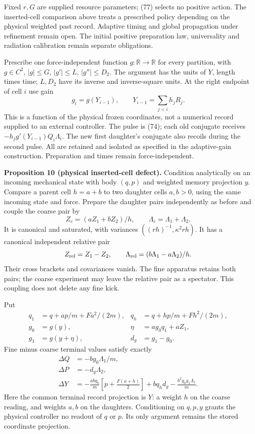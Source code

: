 \documentclass[11pt,a4paper]{article}
\begin{document}
Fixed \(r,G\) are supplied resource parameters; (77) selects no positive
action. The inserted-cell comparison above treats a prescribed policy
depending on the physical weighted past record. Adaptive timing and
global propagation under refinement remain open. The initial positive
preparation law, universality and radiation calibration remain separate
obligations.

Prescribe one force-independent function \(g:\mathbb R\to\mathbb R\) for
every partition, with \(g\in C^2\), \(|g|\le G\), \(|g'|\le L\),
\(|g''|\le D_2\). The argument has the units of \(Y\), length times
time; \(L,D_2\) have its inverse and inverse-square units. At the right
endpoint of cell \(i\) use gain
\[g_i=g(Y_{i-1}),\qquad Y_{i-1}=\sum_{j<i}h_jR_j.\] This is a function
of the physical frozen coordinates, not a numerical record supplied to
an external controller. The pulse is (74); each old conjugate receives
\(-h_jg'(Y_{i-1})Q_i\Lambda_i\). The new first daughter's conjugate also
recoils during the second pulse. All are retained and isolated as
specified in the adaptive-gain construction. Preparation and times
remain force-independent.

\textbf{Proposition 10 (physical inserted-cell defect).} Condition
analytically on an incoming mechanical state with body \((q,p)\) and
weighted memory projection \(y\). Compare a parent cell \(h=a+b\) to two
daughter cells \(a,b>0\), using the same incoming state and force.
Prepare the daughter pairs independently as before and couple the coarse
pair by \[Z_c=(aZ_1+bZ_2)/h,\qquad \Lambda_c=\Lambda_1+\Lambda_2.\] It
is canonical and saturated, with variances \(((rh)^{-1},\kappa^2rh)\).
It has a canonical independent relative pair
\[Z_{\rm rel}=Z_1-Z_2,\qquad
\Lambda_{\rm rel}=(b\Lambda_1-a\Lambda_2)/h.\] Their cross brackets and
covariances vanish. The fine apparatus retains both pairs; the coarse
experiment may leave the relative pair as a spectator. This coupling
does not delete any fine kick.

Put \[\begin{aligned}
q_1&=q+ap/m+Fa^2/(2m),&q_h&=q+hp/m+Fh^2/(2m),\\
g_0&=g(y),&\eta&=ag_0q_1+aZ_1,\\
g_1&=g(y+\eta),&d_g&=g_1-g_0.
\end{aligned}\] Fine minus coarse terminal values satisfy exactly
\[\begin{aligned}
\Delta Q&=-bg_0\Lambda_1/m,\\
\Delta P&=-d_g\Lambda_2,\\
\Delta Y&=-\frac{abg_0}{m}\left[p+\frac{F(a+h)}2\right]
              +bq_hd_g-\frac{b^2g_0g_1\Lambda_1}{m}.
\end{aligned}\tag{79}\] Here the common terminal record projection is
\(Y\): a weight \(h\) on the coarse reading, and weights \(a,b\) on the
daughters. Conditioning on \(q,p,y\) grants the physical controller no
readout of \(q\) or \(p\). Its only argument remains the stored
coordinate projection.
\end{document}

